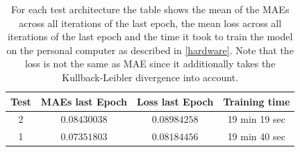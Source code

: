 \begin{center}
    \begin{table}[H]
        \centering
        \begin{tabular}{ | c | c | c | c | }
            \hline
            Test &MAEs last Epoch & Loss last Epoch & Training time\\ \hline
            2 & $0.08430038$  & $0.08984258$  & 19 min 19 sec  \\  
            1 & $0.07351803$  & $0.08184456$  & 19 min 40 sec  \\  
            \hline
        \end{tabular} 
        \caption{For each test architecture the table shows the mean of the MAEs across all iterations of the last
        epoch, the mean loss across all iterations of the last epoch and the time it took to train the model
        on the personal computer as described in \autoref{hardware}. Note that the loss is not the same
        as MAE since it additionally takes the Kullback-Leibler divergence into account.} \label{table_maes3}
    \end{table} 
\end{center}

